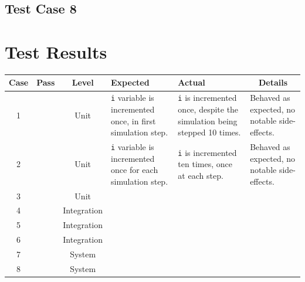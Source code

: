 \documentclass[11pt]{article}
\newcommand{\cmark}{\ding{51}}%
\begin{document}
\subsection{Test Case 8}

\newpage
\section{Test Results}%

\begin{adjustbox}{center}
\begin{tabular}{|c|c|c|p{10em}|p{10em}|p{10em}|}
	\hline
	\textbf{Case} & \textbf{Pass} & \textbf{Level} & \textbf{Expected} & \textbf{Actual} & \multicolumn{1}{c|}{\textbf{Details}} \\
	\hline
	1 & \textcolor{pass_grn}{\cmark} & Unit & \texttt{i} variable is incremented once, in first simulation step. & \texttt{i} is incremented once, despite the simulation being stepped 10 times. & Behaved as expected, no notable side-effects. \\
	\hline
	2 & \textcolor{pass_grn}{\cmark} & Unit & \texttt{i} variable is incremented once for each simulation step. & \texttt{i} is incremented ten times, once at each step. & Behaved as expected, no notable side-effects. \\
	\hline
	3 & \textcolor{pass_grn}{\cmark} & Unit &&& \\
	\hline
	4 & \textcolor{pass_grn}{\cmark} & Integration &&& \\
	\hline
	5 & \textcolor{pass_grn}{\cmark} & Integration &&& \\
	\hline
	6 & \textcolor{pass_grn}{\cmark} & Integration &&& \\
	\hline
	7 & \textcolor{pass_grn}{\cmark} & System &&& \\
	\hline
	8 & \textcolor{pass_grn}{\cmark} & System &&& \\
	\hline
\end{tabular}
\end{adjustbox}

\newpage
\end{document}
